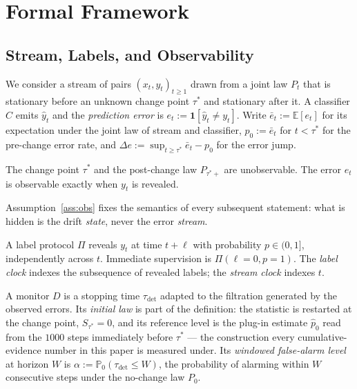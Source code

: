 
\section{Formal Framework}\label{sec:framework}

\subsection{Stream, Labels, and Observability}\label{sec:observability}

We consider a stream of pairs $(x_t, y_t)_{t \ge 1}$ drawn from a joint law
$P_t$ that is stationary before an unknown change point $\tau^*$ and
stationary after it. A classifier $C$ emits $\hat{y}_t$ and the
\emph{prediction error} is $e_t := \mathbf{1}[\hat{y}_t \ne y_t]$.
Write $\bar{e}_t := \mathbb{E}[e_t]$ for its expectation under the joint law
of stream and classifier, $p_0 := \bar{e}_t$ for $t < \tau^*$ for the
pre-change error rate, and $\Delta e := \sup_{t \ge \tau^*} \bar{e}_t - p_0$
for the error jump.

\begin{assumption}\label{ass:obs}
  The change point $\tau^*$ and the post-change law $P_{\tau^*+}$ are
  unobservable. The error $e_t$ is observable exactly when $y_t$ is revealed.
\end{assumption}

Assumption~\ref{ass:obs} fixes the semantics of every subsequent statement:
what is hidden is the drift \emph{state}, never the error \emph{stream}.

\begin{definition}\label{def:labels}
  A label protocol $\Pi$ reveals $y_t$ at time $t + \ell$ with probability
  $p \in (0,1]$, independently across $t$. Immediate supervision is
  $\Pi(\ell{=}0, p{=}1)$. The \emph{label clock} indexes the subsequence of
  revealed labels; the \emph{stream clock} indexes $t$.
\end{definition}

\begin{definition}\label{def:monitor}
  A monitor $D$ is a stopping time $\tau_{\mathrm{det}}$ adapted to the
  filtration generated by the observed errors. Its \emph{initial law} is
  part of the definition: the statistic is restarted at the change point,
  $S_{\tau^*} = 0$, and its reference level is the plug-in estimate
  $\hat p_0$ read from the $1000$ steps immediately before $\tau^*$ ---
  the construction every cumulative-evidence number in this paper is
  measured under. Its \emph{windowed false-alarm level} at horizon $W$ is
  $\alpha := \mathbb{P}_0(\tau_{\mathrm{det}} \le W)$, the probability of
  alarming within $W$ consecutive steps under the no-change law $P_0$.
\end{definition}

